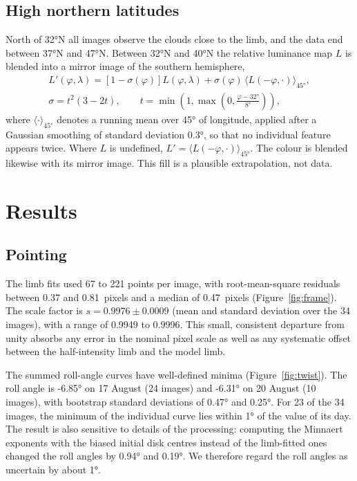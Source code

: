 \documentclass[11pt,a4paper]{article}
\begin{document}
\subsection{High northern latitudes}\label{sec:north}

North of \ang{32}N all images observe the clouds close to the limb, and the data end between
\ang{37}N and \ang{47}N. Between \ang{32}N and \ang{40}N the relative luminance map $L$ is blended
into a mirror image of the southern hemisphere,
\begin{gather}
L'(\varphi, \lambda) = \left[1 - \sigma(\varphi)\right] L(\varphi, \lambda) + \sigma(\varphi)\,
\langle L(-\varphi, \cdot)\rangle_{\ang{45}},
\label{eq:fill}\\
\sigma = t^{2}(3 - 2t), \qquad t = \min\!\left(1, \max\!\left(0, \frac{\varphi - \ang{32}}{\ang{8}}
\right)\right),
\nonumber
\end{gather}
where $\langle\cdot\rangle_{\ang{45}}$ denotes a running mean over \ang{45} of longitude, applied
after a Gaussian smoothing of standard deviation \ang{0.3}, so that no individual feature appears
twice. Where $L$ is undefined, $L' = \langle L(-\varphi, \cdot)\rangle_{\ang{45}}$. The colour is
blended likewise with its mirror image. This fill is a plausible extrapolation, not data.

\section{Results}\label{sec:results}

\subsection{Pointing}

The limb fits used 67 to 221 points per image, with root-mean-square residuals between 0.37 and
0.81~pixels and a median of 0.47~pixels (Figure~\ref{fig:frame}). The scale factor is
$s = 0.9976 \pm 0.0009$ (mean and standard deviation over the 34 images), with a range of 0.9949 to
0.9996. This small, consistent departure from unity absorbs any error in the nominal pixel scale as
well as any systematic offset between the half-intensity limb and the model limb.

The summed roll-angle curves have well-defined minima (Figure~\ref{fig:twist}). The roll angle is
\ang{-6.85} on 17 August (24 images) and \ang{-6.31} on 20 August (10 images), with bootstrap
standard deviations of \ang{0.47} and \ang{0.25}. For 23 of the 34 images, the minimum of the
individual curve lies within \ang{1} of the value of its day. The result is also sensitive to
details of the processing: computing the Minnaert exponents with the biased initial disk centres
instead of the limb-fitted ones changed the roll angles by \ang{0.94} and \ang{0.19}. We therefore
regard the roll angles as uncertain by about \ang{1}.
\end{document}
